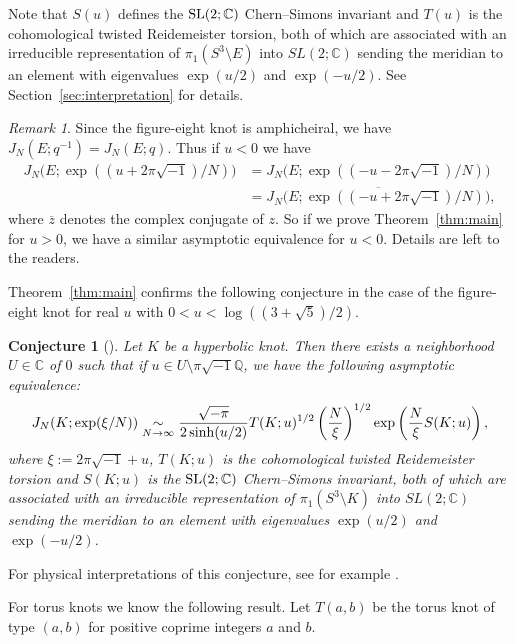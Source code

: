 \documentclass[a4paper]{amsart}
\theoremstyle{plain}
\newtheorem{conj}[thm]{Conjecture}
\theoremstyle{definition}
\theoremstyle{remark}
\newtheorem{rem}[thm]{Remark}
\newcommand{\C}{\mathbb{C}}
\newcommand{\Q}{\mathbb{Q}}
\newcommand{\SL}{\rm{SL}}
\numberwithin{equation}{section}
\begin{document}
Note that $S(u)$ defines the $\SL(2;\C)$ Chern--Simons invariant and $T(u)$ is the cohomological twisted Reidemeister torsion, both of which are associated with an irreducible representation of $\pi_1(S^3\setminus{E})$ into $SL(2;\C)$ sending the meridian to an element with eigenvalues $\exp(u/2)$ and $\exp(-u/2)$.
See Section~\ref{sec:interpretation} for details.
\begin{rem}
Since the figure-eight knot is amphicheiral, we have $J_N(E;q^{-1})=J_N(E;q)$.
Thus if $u<0$ we have
\begin{equation*}
\begin{split}
  J_N\bigl(E;\exp((u+2\pi\sqrt{-1})/N)\bigr)
  &=
  J_N\bigl(E;\exp((-u-2\pi\sqrt{-1})/N)\bigr)
  \\
  &=
  \overline{J_N\bigl(E;\exp((-u+2\pi\sqrt{-1})/N)\bigr)},
\end{split}
\end{equation*}
where $\overline{z}$ denotes the complex conjugate of $z$.
So if we prove Theorem~\ref{thm:main} for $u>0$, we have a similar asymptotic equivalence for $u<0$.
Details are left to the readers.
\end{rem}
\par
Theorem~\ref{thm:main} confirms the following conjecture in the case of the figure-eight knot for real $u$ with $0<u<\log((3+\sqrt{5})/2)$.
\begin{conj}[\cite{Gukov/Murakami:FIC2008,Dimofte/Gukov:Columbia}]
Let $K$ be a hyperbolic knot.
Then there exists a neighborhood $U\in\C$ of $0$ such that if $u\in U\setminus\pi\sqrt{-1}\Q$, we have the following asymptotic equivalence:
\begin{equation*}
  J_N(K;\exp(\xi/N))
  \\
  \underset{N\to\infty}{\sim}
  \frac{\sqrt{-\pi}}{2\sinh(u/2)}
  T(K;u)^{1/2}
  \left(\frac{N}{\xi}\right)^{1/2}
  \exp\left(\frac{N}{\xi}S(K;u)\right),
\end{equation*}
where $\xi:=2\pi\sqrt{-1}+u$, $T(K;u)$ is the cohomological twisted Reidemeister torsion and $S(K;u)$ is the $\SL(2;\C)$ Chern--Simons invariant, both of which are associated with an irreducible representation of $\pi_1(S^3\setminus{K})$ into $SL(2;\C)$ sending the meridian to an element with eigenvalues $\exp(u/2)$ and $\exp(-u/2)$.
\end{conj}
For physical interpretations of this conjecture, see for example \cite{Gukov:COMMP2005,Dimofte/Gukov:Columbia}.
\par
For torus knots we know the following result.
Let $T(a,b)$ be the torus knot of type $(a,b)$ for positive coprime integers $a$ and $b$.
\end{document}
